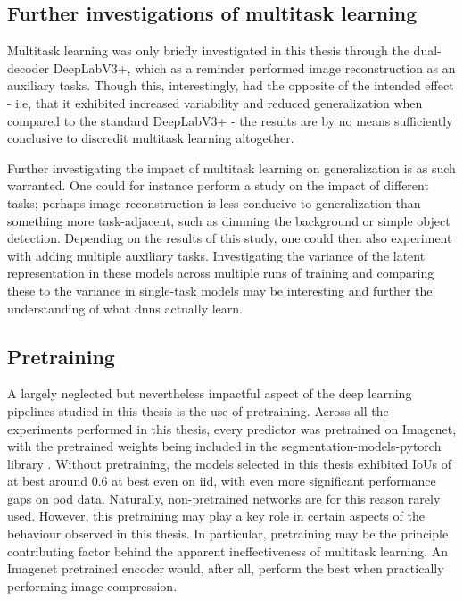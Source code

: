         
    \subsection{Further investigations of multitask learning}
        Multitask learning was only briefly investigated in this thesis through the dual-decoder DeepLabV3+, which as a reminder performed image reconstruction as an auxiliary tasks. Though this, interestingly, had the opposite of the intended effect - i.e, that it exhibited increased variability and reduced generalization when compared to the standard DeepLabV3+ - the results are by no means sufficiently conclusive to discredit multitask learning altogether. 
    
        Further investigating the impact of multitask learning on generalization is as such warranted. One could for instance perform a study on the impact of different tasks; perhaps image reconstruction is less conducive to generalization than something more task-adjacent, such as dimming the background or simple object detection. Depending on the results of this study, one could then also experiment with adding multiple auxiliary tasks. Investigating the variance of the latent representation in these models across multiple runs of training and comparing these to the variance in single-task models may be interesting and further the understanding of what \glspl{dnn} actually learn.
    
    \subsection{Pretraining} \label{pretraining}
        A largely neglected but nevertheless impactful aspect of the deep learning pipelines studied in this thesis is the use of pretraining. Across all the experiments performed in this thesis, every predictor was pretrained on Imagenet, with the pretrained weights being included in the segmentation-models-pytorch library \cite{smp}. Without pretraining, the models selected in this thesis exhibited IoUs of at best around 0.6 at best even on \gls{iid}, with even more significant performance gaps on \gls{ood} data. Naturally, non-pretrained networks are for this reason rarely used. However, this pretraining may play a key role in certain aspects of the behaviour observed in this thesis. In particular, pretraining may be the principle contributing factor behind the apparent ineffectiveness of multitask learning. An Imagenet pretrained encoder would, after all, perform the best when practically performing image compression.
    
